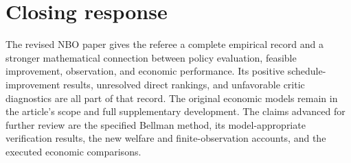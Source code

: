 \section*{Closing response}
The revised NBO paper gives the referee a complete empirical record and a stronger mathematical connection between policy evaluation, feasible improvement, observation, and economic performance. Its positive schedule-improvement results, unresolved direct rankings, and unfavorable critic diagnostics are all part of that record. The original economic models remain in the article's scope and full supplementary development. The claims advanced for further review are the specified Bellman method, its model-appropriate verification results, the new welfare and finite-observation accounts, and the executed economic comparisons.

